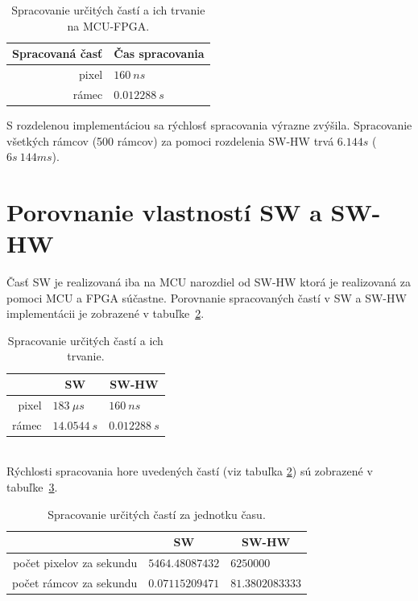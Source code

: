 \documentclass[11pt,a4paper]{article}
\begin{document}
\begin{table}[H]
  \begin{center}
    \begin{tabular}{r|l}
        \multicolumn{1}{c|}{\textbf{Spracovaná časť}} & \multicolumn{1}{c}{\textbf{Čas spracovania}}\\
        \hline
        pixel & $160 \ ns$\\
        rámec & $0.012288 \ s$\\
    \end{tabular}
    \caption{Spracovanie určitých častí a ich trvanie na MCU-FPGA.}
    \label{tab:FPGA_processing}
  \end{center}
\end{table}

S rozdelenou implementáciou sa rýchlosť spracovania výrazne zvýšila. Spracovanie všetkých rámcov (500 rámcov) za pomoci rozdelenia SW-HW trvá $6.144s$ ($6s \ 144 ms$).

\section{Porovnanie vlastností SW a SW-HW}\label{sec:comparison}

Časť SW je realizovaná iba na MCU narozdiel od SW-HW ktorá je realizovaná za pomoci MCU a FPGA súčastne. Porovnanie spracovaných častí v SW a SW-HW implementácii je zobrazené v tabuľke~\ref{tab:compare1}.

\begin{table}[H]
  \begin{center}
    \begin{tabular}{r|l|l}
        & \multicolumn{1}{c|}{\textbf{SW}} & \multicolumn{1}{c}{\textbf{SW-HW}}\\
        \hline
        pixel      & $183 \ \mu s$   & $160 \ ns$      \\
        rámec      & $14.0544 \ s$   & $0.012288 \ s$  \\
    \end{tabular}
    \caption{Spracovanie určitých častí a ich trvanie.}
    \label{tab:compare1}
  \end{center}
\end{table}

\hfill\\[-3em]

Rýchlosti spracovania hore uvedených častí (viz tabuľka \ref{tab:compare1}) sú zobrazené v tabuľke~\ref{tab:compare2}.

\begin{table}[H]
  \begin{center}
    \begin{tabular}{r|l|l}
        & \multicolumn{1}{c|}{\textbf{SW}} & \multicolumn{1}{c}{\textbf{SW-HW}}\\
        \hline
        počet pixelov za sekundu & $5464.48087432$ & $6250000$ \\
        počet rámcov za sekundu & $0.07115209471$ & $81.3802083333$ \\
    \end{tabular}
    \caption{Spracovanie určitých častí za jednotku času.}
    \label{tab:compare2}
  \end{center}
\end{table}
\end{document}

